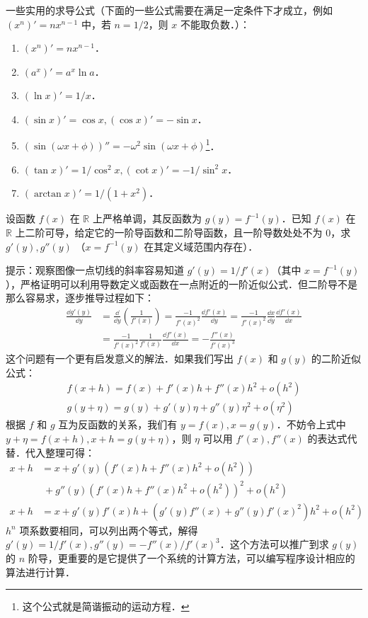 一些实用的求导公式（下面的一些公式需要在满足一定条件下才成立，例如 $(x^n)'=nx^{n-1}$ 中，若 $n=1/2$，则 $x$ 不能取负数．）：
\begin{enumerate}
\item $(x^n)'=nx^{n-1}$．
\item $(a^x)'=a^x\ln a$．
\item $(\ln x)'=1/x$．
\item $(\sin x)'=\cos x,(\cos x)'=-\sin x$．\item $(\sin(\omega x+\phi))''=-\omega^2\sin(\omega x+\phi)$\footnote{这个公式就是简谐振动的运动方程．}．
\item $(\tan x)'=1/\cos^2 x,(\cot x)'=-1/\sin^2 x$．
\item $(\arctan x)'=1/(1+x^2)$．
\end{enumerate}
\begin{exercise}{}
设函数 $f(x)$ 在 $\mathbb{R}$ 上严格单调，其反函数为 $g(y)=f^{-1}(y)$．已知 $f(x)$ 在 $\mathbb{R}$ 上二阶可导，给定它的一阶导函数和二阶导函数，且一阶导数处处不为 $0$，求 $g'(y),g''(y)$ （$x=f^{-1}(y)$ 在其定义域范围内存在）．

提示：观察图像一点切线的斜率容易知道 $g'(y)=1/f'(x)$（其中 $x=f^{-1}(y)$），严格证明可以利用导数定义或函数在一点附近的一阶近似公式．但二阶导不是那么容易求，逐步推导过程如下：
\begin{equation}
\begin{aligned}
\frac{\dd g'(y)}{\dd y}&=\frac{\dd}{\dd y}\left(\frac{1}{f'(x)}\right)=\frac{-1}{f'(x)^2}\frac{\dd f'(x)}{\dd y}=\frac{-1}{f'(x)^2}\frac{\dd x}{\dd y}\frac{\dd f'(x)}{\dd x}\\
&=\frac{-1}{f'(x)^2}\frac{1}{f'(x)}\frac{\dd f'(x)}{\dd x}=-\frac{f''(x)}{f'(x)^3}
\end{aligned}
\end{equation}
这个问题有一个更有启发意义的解法．如果我们写出 $f(x)$ 和 $g(y)$ 的二阶近似公式：
\begin{equation}
\begin{aligned}
f(x+h)=f(x)+f'(x)h+f''(x)h^2+o(h^2)\\
g(y+\eta)=g(y)+g'(y)\eta+g''(y)\eta^2+o(\eta^2)
\end{aligned}
\end{equation}
根据 $f$ 和 $g$ 互为反函数的关系，我们有 $y=f(x),x=g(y)$．不妨令上式中 $y+\eta=f(x+h),x+h=g(y+\eta)$，则 $\eta$ 可以用 $f'(x),f''(x)$ 的表达式代替．代入整理可得：
\begin{equation}
\begin{aligned}
x+h&=x+g'(y)(f'(x)h+f''(x)h^2+o(h^2))\\
&\ +g''(y)(f'(x)h+f''(x)h^2+o(h^2))^2+o(h^2)\\
x+h&=x+g'(y)f'(x)h + (g'(y)f''(x)+g''(y)f'(x)^2)h^2+o(h^2)
\end{aligned}
\end{equation}
$h^n$ 项系数要相同，可以列出两个等式，解得 $g'(y)=1/f'(x),g''(y)=-f''(x)/f'(x)^3$．这个方法可以推广到求 $g(y)$ 的 $n$ 阶导，更重要的是它提供了一个系统的计算方法，可以编写程序设计相应的算法进行计算．
\end{exercise}